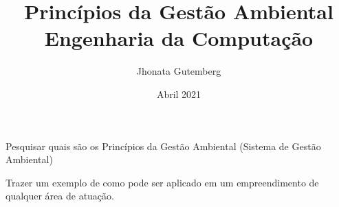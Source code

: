 \documentclass[a4paper, 12pt]{article}
\title{
    Princípios da Gestão Ambiental \\
    \large Engenharia da Computação
}
\author{
    Jhonata Gutemberg
}
\date{Abril 2021}
\begin{document}
    \maketitle

    \par Pesquisar quais são os Princípios da Gestão Ambiental (Sistema de Gestão Ambiental) 
    
    \par Trazer um exemplo de como pode ser aplicado em um empreendimento de qualquer área de atuação.
\end{document}
